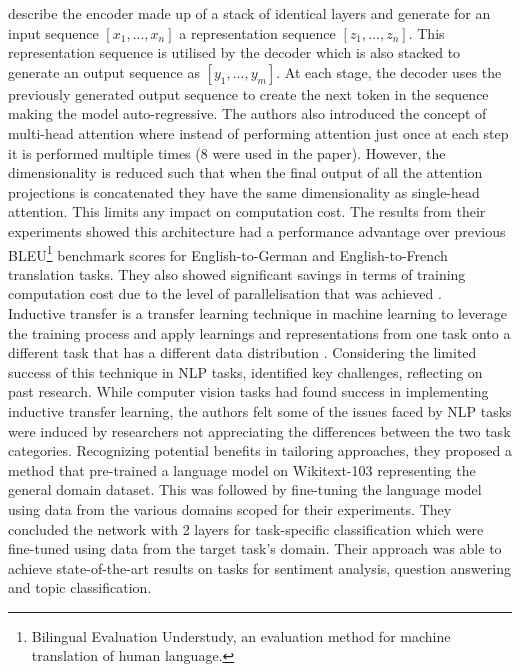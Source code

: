 \cite{vaswaniAttentionAllYou2023a} describe the encoder made up of a stack of identical layers and generate for an input sequence $[x_1, ..., x_n]$ a representation sequence $[z_1, ..., z_n]$. This representation sequence is utilised by the decoder which is also stacked to generate an output sequence as $[y_1, ..., y_m]$. At each stage, the decoder uses the previously generated output sequence to create the next token in the sequence making the model auto-regressive. The authors also introduced the concept of multi-head attention where instead of performing attention just once at each step it is performed multiple times (8 were used in the paper). However, the dimensionality is reduced such that when the final output of all the attention projections is concatenated they have the same dimensionality as single-head attention. This limits any impact on computation cost. The results from their experiments showed this architecture had a performance advantage over previous BLEU\footnote{Bilingual Evaluation Understudy, an evaluation method for machine translation of human language.} benchmark scores for English-to-German and English-to-French translation tasks. They also showed significant savings in terms of training computation cost due to the level of parallelisation that was achieved \cite{vaswaniAttentionAllYou2023a}. \\

Inductive transfer is a transfer learning technique in machine learning to leverage the training process and apply learnings and representations from one task onto a different task that has a different data distribution \cite{howardUniversalLanguageModel2018}. Considering the limited success of this technique in NLP tasks, \cite{howardUniversalLanguageModel2018} identified key challenges, reflecting on past research.  While computer vision tasks had found success in implementing inductive transfer learning, the authors felt some of the issues faced by NLP tasks were induced by researchers not appreciating the differences between the two task categories. Recognizing potential benefits in tailoring approaches, they proposed a method that pre-trained a language model on Wikitext-103 \cite{merityPointerSentinelMixture2016} representing the general domain dataset. This was followed by fine-tuning the language model using data from the various domains scoped for their experiments. They concluded the network with 2 layers for task-specific classification which were fine-tuned using data from the target task's domain. Their approach was able to achieve state-of-the-art results on tasks for sentiment analysis, question answering and topic classification.\\

